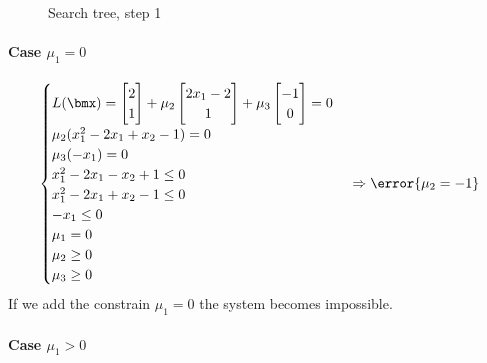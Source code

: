 \documentclass[\main/main.tex]{subfiles}
\begin{document}
\begin{figure}
  \caption{Search tree, step 1}
\end{figure}

\paragraph*{Case $\mu_1=0$}
\[
  \begin{cases}
    L(\bmx) = \begin{bmatrix}
      2 \\
      1
    \end{bmatrix} + \mu_2 \begin{bmatrix}
      2x_1 -2 \\
      1
    \end{bmatrix} + \mu_3 \begin{bmatrix}
      -1 \\
      0
    \end{bmatrix} = 0 \\
    \mu_2(x_1^2 - 2x_1 + x_2 -1 ) = 0                                                                              \\
    \mu_3(-x_1                  ) = 0                                                                              \\
    x_1^2 - 2x_1 - x_2 + 1          \leq 0                                                                         \\
    x_1^2 - 2x_1 + x_2 -1           \leq 0                                                                         \\
    -x_1                            \leq 0                                                                         \\
    \mu_1 = 0                                                                                                      \\
    \mu_2 \geq 0                                                                                                   \\
    \mu_3 \geq 0
  \end{cases}
  \Rightarrow
  \error{\mu_2 = -1}
\]
If we add the constrain $\mu_1=0$ the system becomes impossible.

\paragraph*{Case $\mu_1>0$}
\end{document}
